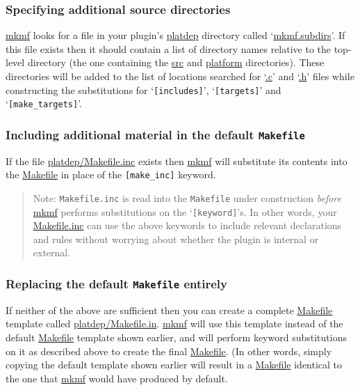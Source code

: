 \documentclass{article}
\newcommand{\cmd}{\url}
\newcommand{\cmd}{\texttt}
\newenvironment{note}{\begin{quote}\color{red} Note: }{\end{quote}}
\begin{document}
\subsubsection{Specifying additional source directories}

\cmd{mkmf}
looks for a file in your plugin's
\cmd{platdep} directory called
`\cmd{mkmf.subdirs}'.
If this file exists then it should contain a list of directory names relative to
the top-level directory (the one containing the \cmd{src} and
\cmd{platform} directories).  These
directories
will be added to the list of locations searched for
`\cmd{.c}' and `\cmd{.h}' files while
constructing the substitutions for `\texttt{[includes]}',
`\texttt{[targets]}' and `\texttt{[make\_targets]}'.

\subsubsection{Including additional material in the default \texttt{Makefile}}

If the file \cmd{platdep/Makefile.inc}
exists then \cmd{mkmf} will
substitute its contents into the \cmd{Makefile} in place of the
\texttt{[make\_inc]} keyword.

\begin{note}
\texttt{Makefile.inc}
is read into the \texttt{Makefile} under
construction \emph{before} \cmd{mkmf} performs substitutions on the
`\texttt{[keyword]}'s.  In other words, your \cmd{Makefile.inc} can
use the above keywords to include relevant declarations and rules
without worrying about whether the plugin is internal or external.
\end{note}


\subsubsection{Replacing the default \texttt{Makefile} entirely}

If neither of the above are sufficient then you can create a complete
\cmd{Makefile}
template called \cmd{platdep/Makefile.in}.
\cmd{mkmf} will use this template instead of the default \cmd{Makefile} template
shown earlier, and will perform keyword substitutions on it as
described above to create the final \cmd{Makefile}.  (In other words,
simply copying the default template shown earlier will result in a
\cmd{Makefile} identical to the one that \cmd{mkmf} would have
produced by default.
\end{document}
